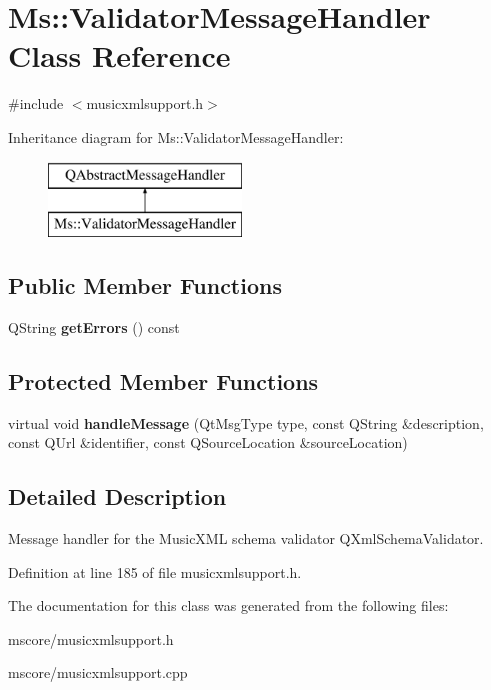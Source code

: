 \hypertarget{class_ms_1_1_validator_message_handler}{}\section{Ms\+:\+:Validator\+Message\+Handler Class Reference}
\label{class_ms_1_1_validator_message_handler}


{\ttfamily \#include $<$musicxmlsupport.\+h$>$}

Inheritance diagram for Ms\+:\+:Validator\+Message\+Handler\+:\begin{figure}[H]
\begin{center}
\leavevmode
\includegraphics[height=2.000000cm]{class_ms_1_1_validator_message_handler}
\end{center}
\end{figure}
\subsection*{Public Member Functions}
\begin{DoxyCompactItemize}
\item 
\mbox{\label{class_ms_1_1_validator_message_handler_a86d5d36d5e8fe4802dc3bcae028ae329}} 
Q\+String {\bfseries get\+Errors} () const
\end{DoxyCompactItemize}
\subsection*{Protected Member Functions}
\begin{DoxyCompactItemize}
\item 
\mbox{\label{class_ms_1_1_validator_message_handler_a01f70e59279bf00edeefb0e504b64e92}} 
virtual void {\bfseries handle\+Message} (Qt\+Msg\+Type type, const Q\+String \&description, const Q\+Url \&identifier, const Q\+Source\+Location \&source\+Location)
\end{DoxyCompactItemize}


\subsection{Detailed Description}
Message handler for the Music\+X\+ML schema validator Q\+Xml\+Schema\+Validator. 

Definition at line 185 of file musicxmlsupport.\+h.



The documentation for this class was generated from the following files\+:\begin{DoxyCompactItemize}
\item 
mscore/musicxmlsupport.\+h\item 
mscore/musicxmlsupport.\+cpp\end{DoxyCompactItemize}
